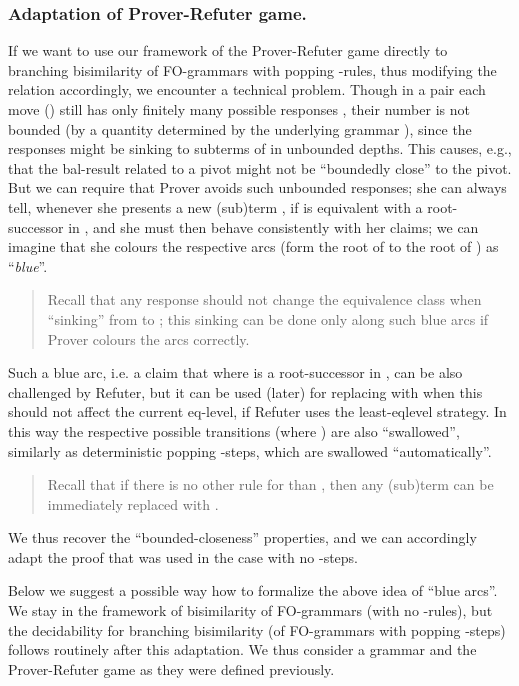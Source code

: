 \documentclass{llncs}
\begin{document}
\subsubsection*{Adaptation of Prover-Refuter game.}
If we want to use our framework of the Prover-Refuter game
directly to branching bisimilarity
of FO-grammars with popping -rules, 
thus modifying the relation  accordingly,
we encounter a
technical problem. Though in a pair  each move 
 () still
has 
only finitely many possible responses 
,
their number is not bounded (by a quantity determined by the
underlying grammar ), since the responses might
be sinking to subterms of  in unbounded depths. 
This causes, e.g., that the bal-result related to a pivot might not be
``boundedly close'' to the pivot. But we can require that Prover
avoids such unbounded responses; she can always tell,
whenever she presents a new (sub)term , 
if  is equivalent with a root-successor  in ,
and she must then behave consistently with her claims;
we can imagine that she colours the respective arcs (form the root of
 to the root of ) as ``\emph{blue}''.
\begin{quote}
	{\small
	Recall that any response
 should not change the equivalence class
when ``sinking'' from  to ; this sinking can be done only along such
blue arcs if Prover colours the arcs correctly.
}
\end{quote}
Such a blue arc, i.e. a claim that  where  is a root-successor in ,
can be also challenged by Refuter, 
 but it can be used (later)
for replacing  with  when this should not affect
the current eq-level,
if Refuter uses the least-eqlevel strategy.
In this way the respective possible transitions
 (where ) are
also ``swallowed'', similarly as deterministic popping
-steps, which are swallowed ``automatically''. 
\begin{quote}
	{\small
Recall that if there is no other rule
for  than , then any (sub)term 
 can be immediately replaced with .
}
\end{quote}
We thus recover the ``bounded-closeness'' properties, and we can
accordingly adapt the proof that was used in the case with no
-steps. 

Below we suggest a possible way how to formalize the above idea
 of ``blue arcs''.
We stay in the framework of bisimilarity of FO-grammars (with
no -rules),
but the decidability for branching bisimilarity
(of FO-grammars with popping -steps)
follows routinely  after this adaptation.
We thus consider a grammar  and the
Prover-Refuter game as they were defined previously.
\end{document}
